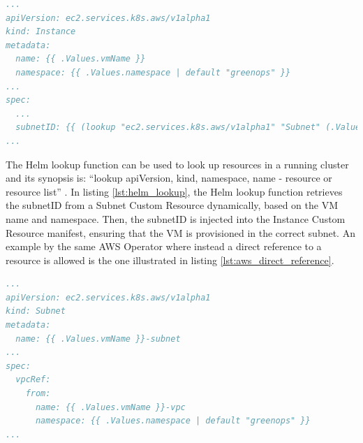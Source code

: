 \begin{lstlisting}[language=yaml, caption={Helm Lookup example: dynamically resolving SubnetIDs}, label={lst:helm_lookup}, float=htpb]
...
apiVersion: ec2.services.k8s.aws/v1alpha1
kind: Instance
metadata:
  name: {{ .Values.vmName }}
  namespace: {{ .Values.namespace | default "greenops" }}
...
spec:
  ...
  subnetID: {{ (lookup "ec2.services.k8s.aws/v1alpha1" "Subnet" (.Values.namespace | default "greenops") (printf "%s-subnet" .Values.vmName)).status.subnetID }}
...
\end{lstlisting}

The Helm lookup function can be used to look up resources in a running cluster and its synopsis is: ``lookup apiVersion, kind, namespace, name -\> resource or resource list'' \cite{helm_lookup}.
In listing \ref{lst:helm_lookup}, the Helm lookup function retrieves the subnetID from a Subnet Custom Resource dynamically, based on the VM name and namespace. Then, the subnetID is injected into the Instance Custom Resource manifest, ensuring that the VM is provisioned in the correct subnet.
An example by the same AWS Operator where instead a direct reference to a resource is allowed is the one illustrated in listing \ref{lst:aws_direct_reference}. \\

\begin{lstlisting}[language=yaml, caption={AWS Operator direct reference example}, label={lst:aws_direct_reference}, float=htpb]
...
apiVersion: ec2.services.k8s.aws/v1alpha1
kind: Subnet
metadata:
  name: {{ .Values.vmName }}-subnet
...
spec:
  vpcRef: 
    from: 
      name: {{ .Values.vmName }}-vpc
      namespace: {{ .Values.namespace | default "greenops" }}
...
\end{lstlisting}

